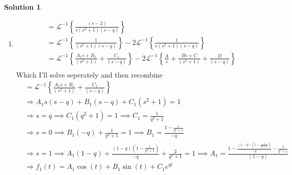 \documentclass[10pt]{article}
\theoremstyle{definition}
\newtheorem{soln}{Solution}
\newcommand{\laplacei}[1]{\mathcal{L}^{-1}\left\{#1\right\}}
\begin{document}
\begin{soln}~
  \begin{enumerate}[label=(\alph*)]
    \item \begin{align*}
             & =\laplacei{\frac{\left(s-2\right)}{s\left(s^2+1\right)\left(s-q\right)}}                                                                                        \\
             & =\laplacei{\frac{1}{\left(s^2+1\right)\left(s-q\right)}}-2\laplacei{\frac{1}{s\left(s^2+1\right)\left(s-q\right)}}                                              \\
             & =\laplacei{\frac{A_1s+B_1}{\left(s^2+1\right)}+\frac{C_1}{\left(s-q\right)}}-2\laplacei{\frac{A}{s}+\frac{Bs+C}{\left(s^2+1\right)}+\frac{D}{\left(s-q\right)}} \\
          \end{align*}
          Which I'll solve seperately and then recombine
          \begin{align*}
             & =\laplacei{\frac{A_1s+B_1}{\left(s^2+1\right)}+\frac{C_1}{\left(s-q\right)}}                                                                                                                                                             \\
             & \Rightarrow A_1s\left(s-q\right)+B_1\left(s-q\right)+C_1\left(s^2+1\right)=1                                                                                                                                                             \\
             & \Rightarrow s=q \implies C_1\left(q^2+1\right)=1 \implies C_1=\frac{1}{q^2+1}                                                                                                                                                            \\
             & \Rightarrow s=0 \implies B_1\left(-q\right)+\frac{1}{q^2+1}=1 \implies B_1=\frac{1-\frac{1}{q^2+1}}{-q}                                                                                                                                  \\
             & \Rightarrow s=1\implies A_1\left(1-q\right)+\frac{\left(1-q\right)\left(1-\frac{1}{q^2+1}\right)}{-q}+\frac{2}{q^2+1}=1\implies A_1=\frac{1-\frac{\left(1-q\right)\left(1-\frac{1}{q^2+1}\right)}{-q}-\frac{2}{q^2+1}}{\left(1-q\right)} \\
             & \Rightarrow f_1(t)=A_1\cos\left(t\right)+B_1\sin\left(t\right)+C_1e^{qt}                                                                                                                                                                 \\

\end{align*}
\end{enumerate}
\end{soln}
\end{document}
